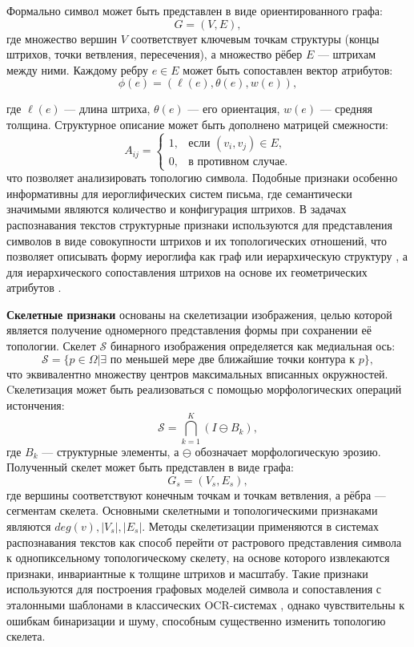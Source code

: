 Формально символ может быть представлен в виде ориентированного графа:
\[
    G=(V,E),
\]
где множество вершин $V$ соответствует ключевым точкам структуры (концы штрихов, точки ветвления, пересечения), а множество рёбер $E$ — штрихам между ними. Каждому ребру $e \in E$ может быть сопоставлен вектор атрибутов:
\[
    \phi(e) = (\ell(e), \theta(e), w(e)),
\]

где $\ell(e)$ — длина штриха, $\theta(e)$ — его ориентация, $w(e)$ — средняя толщина. Структурное описание может быть дополнено матрицей смежности:
\[
    A_{ij} =
    \begin{cases}
        1, & \text{если } (v_i, v_j)\in E, \\
        0, & \text{в противном случае}.
    \end{cases}
\]
что позволяет анализировать топологию символа. Подобные признаки особенно информативны для иероглифических систем письма, где семантически значимыми являются количество и конфигурация штрихов. В задачах распознавания текстов структурные признаки используются для представления символов в виде совокупности штрихов и их топологических отношений, что позволяет описывать форму иероглифа как граф или иерархическую структуру \cite{wang2001optical}, а для иерархического сопоставления штрихов на основе их геометрических атрибутов \cite{shi2001radical, zeng2022star, yu2024chinese}.

\textbf{Скелетные признаки} основаны на скелетизации изображения, целью которой является получение одномерного представления формы при сохранении её топологии. Скелет $\mathcal{S}$ бинарного изображения определяется как медиальная ось:
\[
    \mathcal{S} = \{p\in\Omega | \exists \text{ по меньшей мере две ближайшие точки контура к } p\},
\]
что эквивалентно множеству центров максимальных вписанных окружностей. Cкелетизация может быть реализоваться с помощью морфологических операций истончения:
\[
    \mathcal{S} = \bigcap_{k=1}^{K}(I\ominus B_k),
\]
где $B_k$ — структурные элементы, а $\ominus$ обозначает морфологическую эрозию. Полученный скелет может быть представлен в виде графа:
\[
    G_s=(V_s,E_s),
\]
где вершины соответствуют конечным точкам и точкам ветвления, а рёбра — сегментам скелета. Основными скелетными и топологическими признаками являются \(deg(v), |V_s|, |E_s|\). Методы скелетизации применяются в системах распознавания текстов как способ перейти от растрового представления символа к однопиксельному топологическому скелету, на основе которого извлекаются признаки, инвариантные к толщине штрихов и масштабу. Такие признаки используются для построения графовых моделей символа и сопоставления с эталонными шаблонами в классических OCR-системах \cite{sultane2017character, bag2011medial}, однако чувствительны к ошибкам бинаризации и шуму, способным существенно изменить топологию скелета.

